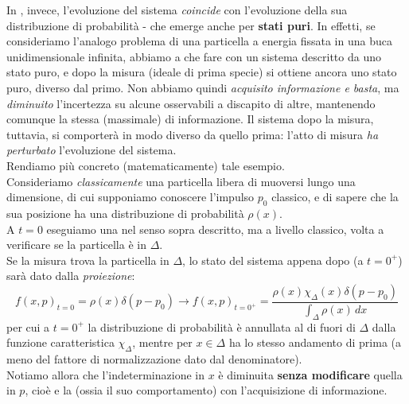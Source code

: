 \documentclass[../../FisicaTeorica.tex]{subfiles}
\begin{document}
In \MQ, invece, l'evoluzione del sistema \textit{coincide} con l'evoluzione della sua distribuzione di probabilità - che emerge anche per \textbf{stati puri}. In effetti, se consideriamo l'analogo problema di una particella a energia fissata in una buca unidimensionale infinita, abbiamo a che fare con un sistema descritto da uno stato puro, e dopo la misura (ideale di prima specie) si ottiene ancora uno stato puro, diverso dal primo. Non abbiamo quindi \textit{acquisito informazione e basta}, ma \textit{diminuito} l'incertezza su alcune osservabili a discapito di altre, mantenendo comunque la stessa  (massimale) di informazione. Il sistema dopo la misura, tuttavia, si comporterà in modo diverso da quello prima: l'atto di misura \textit{ha perturbato} l'evoluzione del sistema.\\

Rendiamo più concreto (matematicamente) tale esempio.\\
Consideriamo \textit{classicamente} una particella libera di muoversi lungo una dimensione, di cui supponiamo conoscere l'impulso $p_0$ classico, e di sapere che la sua posizione ha una distribuzione di probabilità $\rho(x)$.\\
A $t=0$ eseguiamo una  nel senso sopra descritto, ma a livello classico, volta a verificare se la particella è in $\Delta$.\\
Se la misura trova la particella in $\Delta$, lo stato del sistema appena dopo (a $t=0^+$) sarà dato dalla \textit{proiezione}:
\[
f(x,p)_{t=0} = \rho(x)\delta(p-p_0)\to 
f(x,p)_{t=0^+} =
\frac{\rho(x)\chi_\Delta(x)\delta(p-p_0)}{\displaystyle \int_\Delta \rho(x)\,dx}
\]
per cui a $t=0^+$ la distribuzione di probabilità è annullata al di fuori di $\Delta$ dalla funzione caratteristica $\chi_\Delta$, mentre per $x\in \Delta$ ha lo stesso andamento di prima (a meno del fattore di normalizzazione dato dal denominatore).\\
Notiamo allora che l'indeterminazione in $x$ è diminuita \textbf{senza modificare} quella in $p$, cioè e la  (ossia il suo comportamento) con l'acquisizione di informazione.\\
\end{document}
